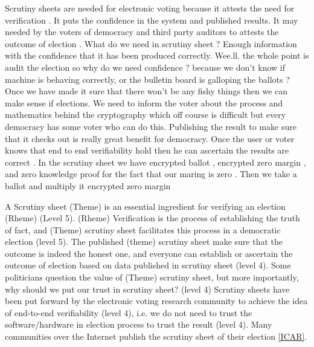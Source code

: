 Scrutiny sheets are needed for electronic voting because it attests the need for verification . It puts the confidence 
in the system and published results. It may needed by the voters of democracy and third party auditors to 
attests the outcome of election . What do we need in scrutiny sheet ? Enough information with the confidence
that it has been produced correctly. Wee.ll. the whole point is audit the election so why do we need 
confidence ? because we don't know if machine is behaving correctly, or the bulletin board is galloping
the ballots ? Once we have made it sure that there won't be any fishy things then we can make sense if 
elections. We need to inform the voter about the process and mathematics behind the cryptography 
which off course is difficult but every democracy has some voter who can do this. Publishing the result 
to make sure that it checks out is really great benefit for democracy. Once the user or voter knows that 
end to end verifiability hold then he can ascertain the results are correct . In the scrutiny sheet  
we have encrypted ballot , encrypted zero margin , and zero knowledge proof for the fact that 
our maring is zero . Then we take a ballot and multiply it encrypted zero margin 



A Scrutiny sheet (Theme) is an essential ingredient for verifying an election (Rheme) (Level 5). 
(Rheme) Verification 
is the process 
of establishing the truth of fact, and (Theme) scrutiny sheet facilitates this process in a democratic election 
(level 5). 
The published (theme) scrutiny sheet make sure that the outcome is indeed the honest one, and 
everyone can establish or ascertain the outcome of election based on data published in scrutiny
sheet (level 4). Some politicians question the value of (Theme) scrutiny sheet, but
more importantly, why should we put our trust in scrutiny sheet? (level 4) Scrutiny sheets have been put 
forward by the electronic voting research community to achieve the  
idea of end-to-end verifiability (level 4), i.e. we do not need to trust the 
software/hardware in election process to trust the result (level 4). 
Many communities over the Internet publish the scrutiny sheet of their 
election \ref{ICAR}.  


